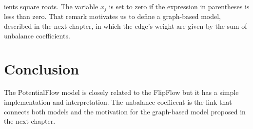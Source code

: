 ients square roots. The variable $x_j$ is set to zero if the expression in parentheses is less than zero. That remark motivates us to define a graph-based model, described in the next chapter, in which the edge's weight are given by the sum of unbalance coefficients.


\section{Conclusion}
The PotentialFlow model is closely related to the FlipFlow but it has a simple implementation and interpretation. The unbalance coefficent is the link that connects both models and the motivation for the graph-based model proposed in the next chapter.




